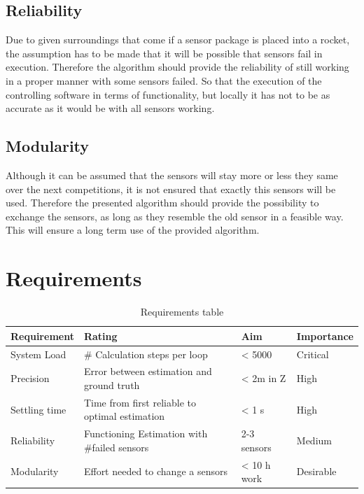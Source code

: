  \subsection{Reliability}
 Due to given surroundings that come if a sensor package is placed into a rocket, the assumption has to be made that it will be possible that sensors fail in execution.
 Therefore the algorithm should provide the reliability of still working in a proper manner with some sensors failed. So that the execution of the controlling software
 in terms of functionality, but locally it has not to be as accurate as it would be with all sensors working.

 \subsection{Modularity}
 Although it can be assumed that the sensors will stay more or less they same over the next competitions, it is not ensured that exactly this sensors will be used.
 Therefore the presented algorithm should provide the possibility to exchange the sensors, as long as they resemble the old sensor in a feasible way.
 This will ensure a long term use of the provided algorithm.
 
 \section{Requirements}
 
 \begin{table}[h]
 \centering
 \begin{tabular}{|l|l|l|l|}	
 \hline	
 \bf{Requirement}   & \bf{Rating} & \bf{Aim} & \bf{Importance} \\ \hline
 System Load   & \# Calculation steps per loop & < 5000 & Critical \\ \hline
 Precision     & Error between estimation and ground truth  & < 2m in Z & High  \\ \hline
 Settling time & Time from first reliable to optimal estimation  & < 1 s &  High \\ \hline
 Reliability   & Functioning Estimation with \#failed sensors & 2-3 sensors & Medium \\ \hline	
 Modularity    & Effort needed to change a sensors & < 10 h work &  Desirable \\ \hline
 \end{tabular}	
 \caption{Requirements table}
 \label{tab:Requirements}
 \end{table}
 

